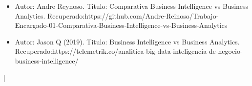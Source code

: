 \documentclass[twoside,twocolumn]{article}
\begin{document}
\begin{itemize}
\item Autor: Andre Reynoso.
\newline
\newline
Titulo: Comparativa Business Intelligence vs Business Analytics.
\newline
\newline
Recuperado:https://github.com/Andre-Reinoso/Trabajo-Encargado-01-Comparativa-Business-Intelligence-vs-Business-Analytics


\item Autor: Jason Q (2019).
\newline
\newline
Titulo: Business Intelligence vs Business Analytics.
\newline
\newline
Recuperado:https://telemetrik.co/analitica-big-data-inteligencia-de-negocio-business-intelligence/


\end{itemize}
|
\end{document}
